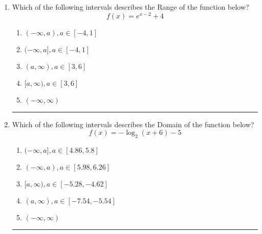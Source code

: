\documentclass[14pt]{extbook}
\newcommand{\litem}[1]{\item#1\hspace*{-1cm}\rule{\textwidth}{0.4pt}}
\begin{document}
\begin{enumerate}
{\begin{enumerate}[label=\Alph*.]
\end{enumerate} }
\litem{
Which of the following intervals describes the Range of the function below?\[ f(x) = e^{x-2}+4 \]\begin{enumerate}[label=\Alph*.]
\item \( (-\infty, a), a \in [-4, 1] \)
\item \( (-\infty, a], a \in [-4, 1] \)
\item \( (a, \infty), a \in [3, 6] \)
\item \( [a, \infty), a \in [3, 6] \)
\item \( (-\infty, \infty) \)

\end{enumerate} }
\litem{
Which of the following intervals describes the Domain of the function below?\[ f(x) = -\log_2{(x+6)}-5 \]\begin{enumerate}[label=\Alph*.]
\item \( (-\infty, a], a \in [4.86, 5.8] \)
\item \( (-\infty, a), a \in [5.98, 6.26] \)
\item \( [a, \infty), a \in [-5.28, -4.62] \)
\item \( (a, \infty), a \in [-7.54, -5.54] \)
\item \( (-\infty, \infty) \)

\end{enumerate} }
\end{enumerate}
\end{document}
